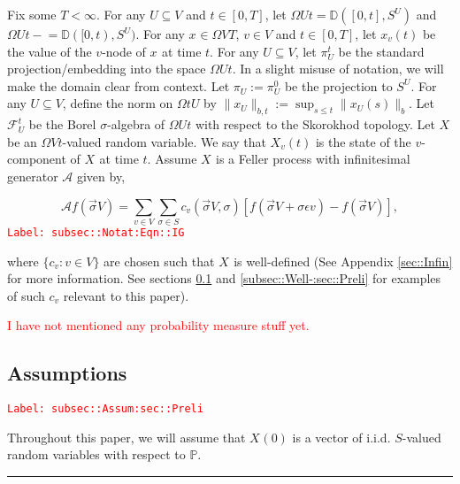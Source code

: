 \documentclass[12pt]{article}
\newcommand{\mb}{\mathbb}
\newcommand{\mc}{\mathcal}
\newcommand{\ep}{\epsilon}
\newcommand{\tr}{\textcolor{red}}
\newcommand{\labe}[1]{\tr{\texttt{Label: #1}}}
\newcommand{\ind}{\hspace{24pt}}
\newcommand{\lin}{\rule{\linewidth}{0.4 pt}}
\newcommand{\pr}{\mb{P}}							%
\newcommand{\defeq}{:=}								%
\newcommand{\cad}{\mb{D}}							%
\renewcommand{\v}{v}							%
\renewcommand{\U}{U}							%
\renewcommand{\S}{S}							%
\newcommand{\s}{\sigma}							%
\newcommand{\sv}{\vec{\s}}						%
\renewcommand{\b}{b}							%
\newcommand{\ev}{\ep}							%
\newcommand{\T}{T}								%
\renewcommand{\t}{t}							%
\newcommand{\IG}{\mc{A}}						%
\newcommand{\V}{V}									%
\renewcommand{\tt}{s}								%
\newcommand{\XState}[1]{\S^{#1}}				%
\newcommand{\piV}[2]{\pi_{#1}^{#2}}					%
\newcommand{\xvt}[2]{x_{#1}{(#2)}}					%
\newcommand{\rxvt}[2]{X_{#1}{(#2)}}					%
\newcommand{\xvts}[2]{x_{#1}{#2}}					%
\newcommand{\rxvts}[2]{X_{#1}{#2}}					%
\newcommand{\IGr}[1]{c_{#1}}						%
\newcommand{\F}[2]{\mc{F}_{#1}^{#2}}				%
\begin{document}
\ind Fix some \(\T < \infty\). For any \(\U\subseteq \V\) and \(\t\in [0,\T]\), let \(\Omega{\U}{\t} = \cad([0,\t],\S^{\U})\) and \(\Omega{\U}{\t-} = \cad([0,\t),\S^\U)\). For any \(\xvts{}{} \in \Omega{\V}{\T}\), \(\v\in \V\) and  \(\t \in [0,\T]\), let \(\xvt{\v}{\t}\) be the value of the \(\v\)-node of \(\xvts{}{}\) at time \(\t\). For any \(\U\subseteq \V\), let \(\piV{\U}{\t}\) be the standard projection/embedding into the space \(\Omega{\U}{\t}\). In a slight misuse of notation, we will make the domain clear from context. Let \(\piV{\U}{} \defeq \piV{\U}{0}\) be the projection to \(\S^\U\). For any \(\U\subseteq \V\), define the norm on \(\Omega{\t}{\U}\) by \(\|\xvts{\U}{}\|_{\b{},\t} \defeq \sup_{\tt \leq \t} \|\xvt{\U}{\tt}\|_{\b{}}\). Let \(\F{\U}{\t}\) be the Borel \(\sigma\)-algebra of \(\Omega{\U}{\t}\) with respect to the Skorokhod topology. Let \(\rxvts{}{}\) be an \(\Omega{\V}{\t}\)-valued random variable. We say that \(\rxvt{\v}{\t}\) is the state of the \(\v\)-component of \(\rxvts{}{}\) at time \(\t\). Assume \(\rxvts{}{}\) is a Feller process with infinitesimal generator \(\IG\) given by,

\begin{equation}
\IG f(\sv{}{\V}) = \sum_{\v \in \V}\sum_{\s \in \S} \IGr{\v}(\sv{}{\V},\s)[f(\sv{}{\V} + \s \ev{\v}) - f(\sv{}{\V})],
\label{subsec::Notat:Eqn::IG}
\end{equation}
\labe{subsec::Notat:Eqn::IG}

where \(\{\IGr{\v}:\v\in \V\}\) are chosen such that \(\rxvts{}{}\) is well-defined (See Appendix \ref{sec::Infin} for more information. See sections \ref{subsec::Assum:sec::Preli} and \ref{subsec::Well-:sec::Preli} for examples of such \(\IGr{\v}\) relevant to this paper). 

\tr{I have not mentioned any probability measure stuff yet.}

\subsection{Assumptions}
\label{subsec::Assum:sec::Preli}\labe{subsec::Assum:sec::Preli}

Throughout this paper, we will assume that \(\rxvt{}{0}\) is a vector of i.i.d. \(\S\)-valued random variables with respect to \(\pr\).

\lin
\end{document}
